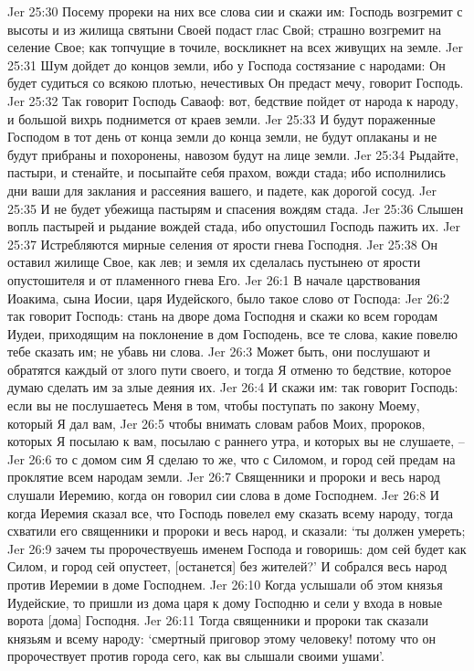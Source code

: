 Jer 25:30  Посему прореки на них все слова сии и скажи им: Господь возгремит с высоты и из жилища святыни Своей подаст глас Свой; страшно возгремит на селение Свое; как топчущие в точиле, воскликнет на всех живущих на земле.
Jer 25:31  Шум дойдет до концов земли, ибо у Господа состязание с народами: Он будет судиться со всякою плотью, нечестивых Он предаст мечу, говорит Господь.
Jer 25:32  Так говорит Господь Саваоф: вот, бедствие пойдет от народа к народу, и большой вихрь поднимется от краев земли.
Jer 25:33  И будут пораженные Господом в тот день от конца земли до конца земли, не будут оплаканы и не будут прибраны и похоронены, навозом будут на лице земли.
Jer 25:34  Рыдайте, пастыри, и стенайте, и посыпайте себя прахом, вожди стада; ибо исполнились дни ваши для заклания и рассеяния вашего, и падете, как дорогой сосуд.
Jer 25:35  И не будет убежища пастырям и спасения вождям стада.
Jer 25:36  Слышен вопль пастырей и рыдание вождей стада, ибо опустошил Господь пажить их.
Jer 25:37  Истребляются мирные селения от ярости гнева Господня.
Jer 25:38  Он оставил жилище Свое, как лев; и земля их сделалась пустынею от ярости опустошителя и от пламенного гнева Его.
Jer 26:1  В начале царствования Иоакима, сына Иосии, царя Иудейского, было такое слово от Господа:
Jer 26:2  так говорит Господь: стань на дворе дома Господня и скажи ко всем городам Иудеи, приходящим на поклонение в дом Господень, все те слова, какие повелю тебе сказать им; не убавь ни слова.
Jer 26:3  Может быть, они послушают и обратятся каждый от злого пути своего, и тогда Я отменю то бедствие, которое думаю сделать им за злые деяния их.
Jer 26:4  И скажи им: так говорит Господь: если вы не послушаетесь Меня в том, чтобы поступать по закону Моему, который Я дал вам,
Jer 26:5  чтобы внимать словам рабов Моих, пророков, которых Я посылаю к вам, посылаю с раннего утра, и которых вы не слушаете, --
Jer 26:6  то с домом сим Я сделаю то же, что с Силомом, и город сей предам на проклятие всем народам земли.
Jer 26:7  Священники и пророки и весь народ слушали Иеремию, когда он говорил сии слова в доме Господнем.
Jer 26:8  И когда Иеремия сказал все, что Господь повелел ему сказать всему народу, тогда схватили его священники и пророки и весь народ, и сказали: `ты должен умереть;
Jer 26:9  зачем ты пророчествуешь именем Господа и говоришь: дом сей будет как Силом, и город сей опустеет, [останется] без жителей?' И собрался весь народ против Иеремии в доме Господнем.
Jer 26:10  Когда услышали об этом князья Иудейские, то пришли из дома царя к дому Господню и сели у входа в новые ворота [дома] Господня.
Jer 26:11  Тогда священники и пророки так сказали князьям и всему народу: `смертный приговор этому человеку! потому что он пророчествует против города сего, как вы слышали своими ушами'.
